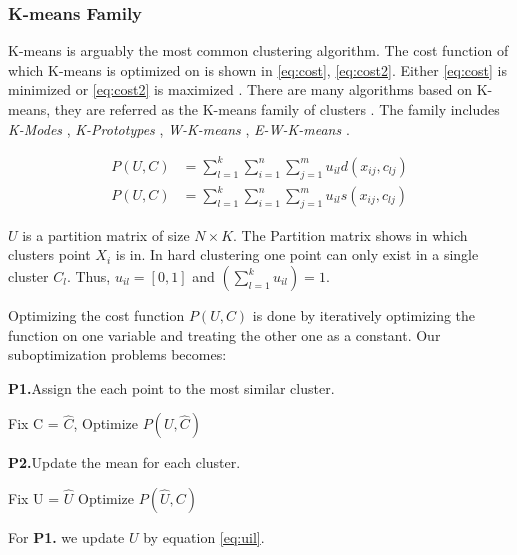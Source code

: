 \documentclass[../report.tex]{subfiles}
\begin{document}
\subsubsection{K-means Family}
K-means is arguably the most common clustering algorithm. The cost function of which K-means is optimized on is shown in \ref{eq:cost}, \ref{eq:cost2}. Either \ref{eq:cost} is minimized or \ref{eq:cost2} is maximized \cite{huang2005automated}.
There are many algorithms based on K-means, they are referred as the K-means family of clusters \cite{Huang1998}. The family includes \textit{K-Modes} \cite{Ng1999}, \textit{K-Prototypes} \cite{Huang97clusteringlarge}, \textit{W-K-means} \cite{huang2005automated}, \textit{E-W-K-means} \cite{Jing2007}.

\begin{align}
  \label{eq:cost}
  P(U,C) &= \sum^k_{l=1} \sum^n_{i=1} \sum^m_{j=1} u_{il} d(x_{ij},c_{lj}) \\
  \label{eq:cost2}
  P(U,C) &= \sum^k_{l=1} \sum^n_{i=1} \sum^m_{j=1} u_{il} s(x_{ij},c_{lj})
\end{align}

$U$ is a partition matrix of size $N \times K$. The Partition matrix shows in which clusters point $X_i$ is in. In hard clustering one point can only exist in a single cluster $C_l$. Thus, $u_{il} = [0,1]$ and $(\sum_{ l=1 }^{ k } u_{il}) = 1$.

Optimizing the cost function $P(U,C)$ is done by iteratively optimizing the function on one variable and treating the other one as a constant. Our suboptimization problems becomes:

\begin{description}
  \item \textbf{P1.}\quad Assign the each point to the most similar cluster. 
    \begin{description}
    	\item Fix C = $\hat{C}$, Optimize $P(U, \hat{ C })$
    \end{description}

  \item \textbf{P2.}\quad Update the mean for each cluster.
    \begin{description}
		\item Fix U = $\hat{U}$ Optimize $P(\hat{ U },C)$
    \end{description}
\end{description}

For \textbf{P1.} we update $U$ by equation \ref{eq:uil}.
\end{document}
